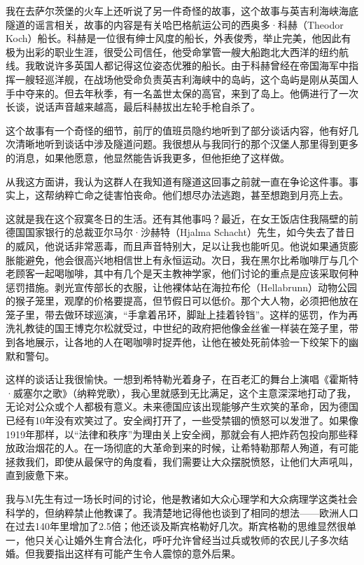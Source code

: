 \documentclass[UTF8]{ctexart}
\begin{document}
我在去萨尔茨堡的火车上还听说了另一件奇怪的故事，这个故事与英吉利海峡海底隧道的谣言相关，故事的内容是有关哈巴格航运公司的西奥多·科赫（Theodor Koch）船长。科赫是一位很有绅士风度的船长，外表俊秀，举止完美，他因此有极为出彩的职业生涯，很受公司信任，他受命掌管一艘大船跑北大西洋的纽约航线。我敢说许多英国人都记得这位姿态优雅的船长。由于科赫曾经在帝国海军中指挥一艘轻巡洋舰，在战场他受命负责英吉利海峡中的岛屿，这个岛屿是刚从英国人手中夺来的。但去年秋季，有一名盖世太保的高官，来到了岛上。他俩进行了一次长谈，说话声音越来越高，最后科赫拔出左轮手枪自杀了。

这个故事有一个奇怪的细节，前厅的值班员隐约地听到了部分谈话内容，他有好几次清晰地听到谈话中涉及隧道问题。我很想从与我同行的那个汉堡人那里得到更多的消息，如果他愿意，他显然能告诉我更多，但他拒绝了这样做。

从我这方面讲，我认为这群人在我知道有隧道这回事之前就一直在争论这件事。事实上，这帮纳粹亡命之徒害怕丧命。他们想尽办法逃跑，甚至想跑到月亮上去。

这就是我在这个寂寞冬日的生活。还有其他事吗？最近，在女王饭店住我隔壁的前德国国家银行的总裁亚尔马尔·沙赫特（Hjalma Schacht）先生，如今失去了昔日的威风，他说话非常恶毒，而且声音特别大，足以让我也能听见。他说如果通货膨胀能避免，他会很高兴地相信世上有永恒运动。次日，我在黑尔比希咖啡厅与几个老顾客一起喝咖啡，其中有几个是天主教神学家，他们讨论的重点是应该采取何种惩罚措施。剥光宣传部长的衣服，让他裸体站在海拉布伦（Hellabrunn）动物公园的猴子笼里，观摩的价格要提高，但节假日可以低价。那个大人物，必须把他放在笼子里，带去做环球巡演，“手拿着吊环，脚趾上挂着铃铛”。这样的惩罚，作为再洗礼教徒的国王博克尔松就受过，中世纪的政府把他像金丝雀一样装在笼子里，带到各地展示，让各地的人在喝咖啡时捉弄他，让他在被处死前体验一下绞架下的幽默和警句。

这样的谈话让我很愉快。一想到希特勒光着身子，在百老汇的舞台上演唱《霍斯特·威塞尔之歌》（纳粹党歌），我心里就感到无比满足，这个主意深深地打动了我，无论对公众或个人都极有意义。未来德国应该出现能够产生欢笑的革命，因为德国已经有10年没有欢笑过了。安全阀打开了，一些受禁锢的愤怒可以发泄了。如果像1919年那样，以“法律和秩序”为理由关上安全阀，那就会有人把炸药包投向那些释放政治烟花的人。在一场彻底的大革命到来的时候，让希特勒那帮人殉道，有可能拯救我们，即使从最保守的角度看，我们需要让大众摆脱愤怒，让他们大声吼叫，直到疲惫下来。

我与M先生有过一场长时间的讨论，他是教诸如大众心理学和大众病理学这类社会科学的，但纳粹禁止他教课了。我清楚地记得他也谈到了相同的想法——欧洲人口在过去140年里增加了2.5倍；他还谈及斯宾格勒好几次。斯宾格勒的思维显然很单一，他只关心让婚外生育合法化，呼吁允许曾经当过兵或牧师的农民儿子多次结婚。但我要指出这样有可能产生令人震惊的意外后果。
\end{document}
